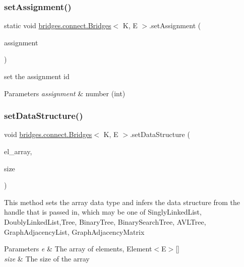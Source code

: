 \subsubsection{\texorpdfstring{set\+Assignment()}{setAssignment()}}
{\footnotesize\ttfamily static void \hyperlink{classbridges_1_1connect_1_1_bridges}{bridges.\+connect.\+Bridges}$<$ K, E $>$.set\+Assignment (\begin{DoxyParamCaption}\item[{int}]{assignment }\end{DoxyParamCaption})\hspace{0.3cm}{\ttfamily [static]}}

set the assignment id


\begin{DoxyParams}{Parameters}
{\em assignment} & number (int) \\
\hline
\end{DoxyParams}
\hypertarget{classbridges_1_1connect_1_1_bridges_a0cc12a419997a8ef0ef54afe9e65d1e9}{}\label{classbridges_1_1connect_1_1_bridges_a0cc12a419997a8ef0ef54afe9e65d1e9} 
\subsubsection{\texorpdfstring{set\+Data\+Structure()}{setDataStructure()}\hspace{0.1cm}{\footnotesize\ttfamily [1/12]}}
{\footnotesize\ttfamily void \hyperlink{classbridges_1_1connect_1_1_bridges}{bridges.\+connect.\+Bridges}$<$ K, E $>$.set\+Data\+Structure (\begin{DoxyParamCaption}\item[{\hyperlink{classbridges_1_1base_1_1_element}{Element}$<$ E $>$ \mbox{[}$\,$\mbox{]}}]{el\+\_\+array,  }\item[{int}]{size }\end{DoxyParamCaption})}

This method sets the array data type and infers the data structure from the handle that is passed in, which may be one of Singly\+Linked\+List, Doubly\+Linked\+List,Tree, Binary\+Tree, Binary\+Search\+Tree, A\+V\+L\+Tree, Graph\+Adjacency\+List, Graph\+Adjacency\+Matrix


\begin{DoxyParams}{Parameters}
{\em e} & The array of elements, Element$<$\+E$>$\mbox{[}\mbox{]} \\
\hline
{\em size} & The size of the array \\
\hline
\end{DoxyParams}
\hypertarget{classbridges_1_1connect_1_1_bridges_a2cd9af150b77b8337327ea67544a0e8f}{}\label{classbridges_1_1connect_1_1_bridges_a2cd9af150b77b8337327ea67544a0e8f} 
